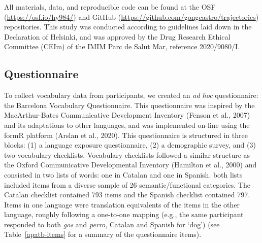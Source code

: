 \documentclass[
  man,
  floatsintext,
  colorlinks=true,linkcolor=blue,citecolor=blue,urlcolor=blue,biblatex]{apa7}
\begin{document}
All materials, data, and reproducible code can be found at the OSF
(\url{https://osf.io/hy984/}) and GitHub
(\url{https://github.com/gongcastro/trajectories}) repositories. This
study was conducted according to guidelines laid down in the Declaration
of Helsinki, and was approved by the Drug Research Ethical Committee
(CEIm) of the IMIM Parc de Salut Mar, reference 2020/9080/I.

\hypertarget{sec-questionnaire}{%
\subsection{Questionnaire}\label{sec-questionnaire}}

To collect vocabulary data from participants, we created an \emph{ad
hoc} questionnaire: the Barcelona Vocabulary Questionnaire. This
questionnaire was inspired by the MacArthur-Bates Communicative
Development Inventory (Fenson et al., 2007) and its adaptations to other
languages, and was implemented on-line using the formR platform (Arslan
et al., 2020). This questionnaire is structured in three blocks: (1) a
language exposure questionnaire, (2) a demographic survey, and (3) two
vocabulary checklists. Vocabulary checklists followed a similar
structure as the Oxford Communicative Developmental Inventory (Hamilton
et al., 2000) and consisted in two lists of words: one in Catalan and
one in Spanish. both lists included items from a diverse sample of 26
semantic/functional categories. The Catalan checklist contained 793
items and the Spanish checklist contained 797. Items in one language
were translation equivalents of the items in the other language, roughly
following a one-to-one mapping (e.g., the same participant responded to
both \emph{gos} and \emph{perro}, Catalan and Spanish for `dog') (see
Table~\ref{apatb-items} for a summary of the questionnaire items).
\end{document}
